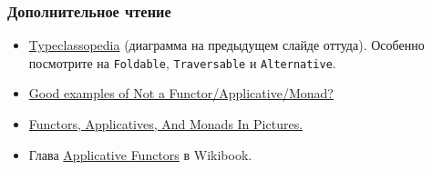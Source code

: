 \documentclass[11pt]{beamer}
\begin{document}
%
%

\begin{frame}[fragile]
\frametitle{Дополнительное чтение}
\begin{itemize}
    \item \href{https://wiki.haskell.org/Typeclassopedia}{Typeclassopedia} (диаграмма на предыдущем слайде оттуда). Особенно посмотрите на \lstinline|Foldable|, \lstinline|Traversable| и \lstinline|Alternative|.
    \item \href{https://stackoverflow.com/questions/7220436/good-examples-of-not-a-functor-functor-applicative-monad}{Good examples of Not a Functor/Applicative/Monad?}
    \item     \href{http://adit.io/posts/2013-04-17-functors,_applicatives,_and_monads_in_pictures.html}{Functors, Applicatives, And Monads In Pictures.}
    \item Глава \href{https://en.wikibooks.org/wiki/Haskell/Applicative_functors}{Applicative Functors} в Wikibook.
    \end{itemize}
\end{frame}
\end{document}
